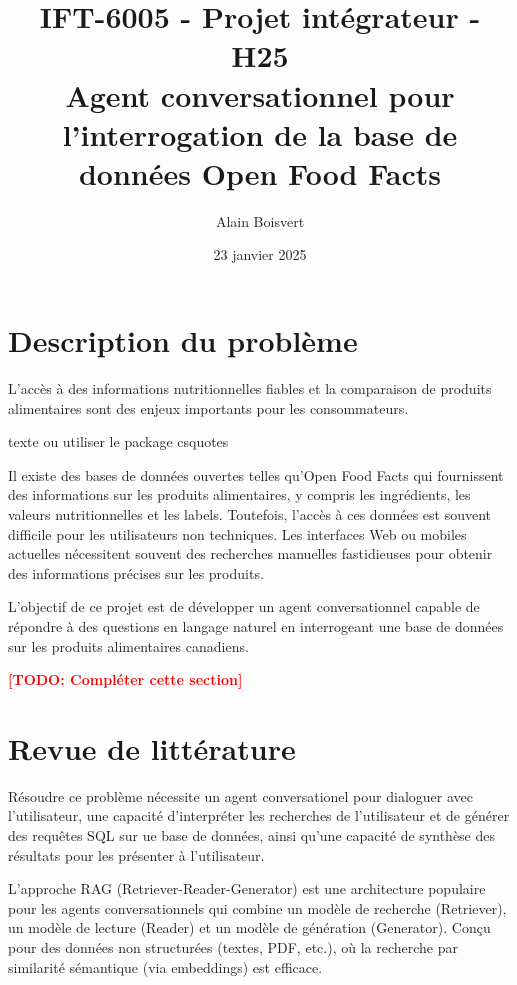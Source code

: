 \documentclass[a4paper,11pt]{article}
\title{IFT-6005 - Projet intégrateur - H25 \\ Agent conversationnel pour l'interrogation de la base de données Open Food Facts}
\author{Alain Boisvert}
\date{23 janvier 2025}
\newcommand{\todo}[1]{\textcolor{red}{\bfseries [TODO: #1]}}
\begin{document}
 

\newpage

\maketitle

\section{Description du problème}
\label{sec:probleme}
L'accès à des informations nutritionnelles fiables et la comparaison de produits alimentaires sont des enjeux importants pour les consommateurs. 

\og texte \fg{} ou utiliser le package csquotes

Il existe des bases de données ouvertes telles qu'Open Food Facts qui fournissent des informations sur les produits alimentaires, y compris les ingrédients, les valeurs nutritionnelles et les labels.
Toutefois, l'accès à ces données est souvent difficile pour les utilisateurs non techniques.
Les interfaces Web ou mobiles actuelles nécessitent souvent des recherches manuelles fastidieuses pour obtenir des informations précises sur les produits.

L’objectif de ce projet est de développer un agent conversationnel capable de répondre à des questions en langage naturel en interrogeant une base de données 
sur les produits alimentaires canadiens.

\todo{Compléter cette section}

\section{Revue de littérature}
\label{sec:revue}

Résoudre ce problème nécessite un agent conversationel pour dialoguer avec l'utilisateur, 
une capacité d'interpréter les recherches de l'utilisateur et de générer des requêtes SQL sur ue base de données, 
ainsi qu'une capacité de synthèse des résultats pour les présenter à l'utilisateur.

L'approche RAG (Retriever-Reader-Generator) est une architecture populaire pour les agents conversationnels qui combine un modèle de recherche (Retriever), un modèle de lecture (Reader) et un modèle de génération (Generator). Conçu pour des données non structurées (textes, PDF, etc.), où la recherche par similarité sémantique (via embeddings) est efficace.
\end{document}
